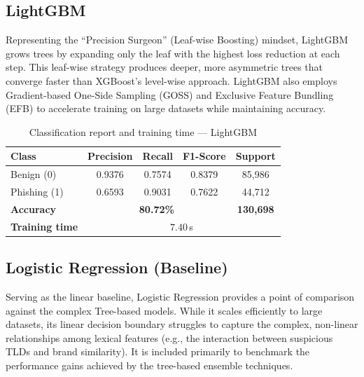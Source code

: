 \documentclass[12pt,a4paper]{article}
\begin{document}
\subsection{LightGBM}
Representing the ``Precision Surgeon'' (Leaf-wise Boosting) mindset, LightGBM grows trees by expanding only the leaf with the highest loss reduction at each step. This leaf-wise strategy produces deeper, more asymmetric trees that converge faster than XGBoost's level-wise approach. LightGBM also employs Gradient-based One-Side Sampling (GOSS) and Exclusive Feature Bundling (EFB) to accelerate training on large datasets while maintaining accuracy.

\begin{table}[H]
    \centering
    \begin{tabular}{lcccc}
        \toprule
        \textbf{Class} & \textbf{Precision} & \textbf{Recall} & \textbf{F1-Score} & \textbf{Support} \\
        \midrule
        Benign (0)     & 0.9376 & 0.7574 & 0.8379 & 85{,}986 \\[2pt]
        Phishing (1)   & 0.6593 & 0.9031 & 0.7622 & 44{,}712 \\
        \midrule
        \textbf{Accuracy} & \multicolumn{3}{c}{\textbf{80.72\%}} & \textbf{130{,}698} \\
        \midrule
        \textbf{Training time} & \multicolumn{4}{c}{$7.40$\,s} \\
        \bottomrule
    \end{tabular}
    \caption{Classification report and training time --- LightGBM}
    \label{tab:lgb_metrics}
\end{table}

\subsection{Logistic Regression (Baseline)}
Serving as the linear baseline, Logistic Regression provides a point of comparison against the complex Tree-based models. While it scales efficiently to large datasets, its linear decision boundary struggles to capture the complex, non-linear relationships among lexical features (e.g., the interaction between suspicious TLDs and brand similarity). It is included primarily to benchmark the performance gains achieved by the tree-based ensemble techniques.
\end{document}
